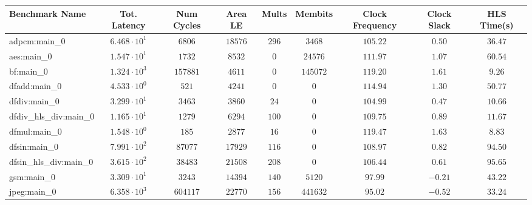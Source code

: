 \begin{tabular}{|l|c|c|c|c|c|c|c|c|}
\hline
Benchmark Name          & Tot. Latency           & Num Cycles  & Area LE    & Mults    & Membits    & Clock Frequency & Clock Slack & HLS Time(s) \\
\hline
adpcm:main\_0           & $ 6.468 \cdot 10^{1} $ & $ 6806    $ & $ 18576  $ & $ 296  $ & $ 3468   $ & $ 105.22      $ & $ 0.50    $ & $ 36.47   $ \\
aes:main\_0             & $ 1.547 \cdot 10^{1} $ & $ 1732    $ & $ 8532   $ & $ 0    $ & $ 24576  $ & $ 111.97      $ & $ 1.07    $ & $ 60.54   $ \\
bf:main\_0              & $ 1.324 \cdot 10^{3} $ & $ 157881  $ & $ 4611   $ & $ 0    $ & $ 145072 $ & $ 119.20      $ & $ 1.61    $ & $ 9.26    $ \\
dfadd:main\_0           & $ 4.533 \cdot 10^{0} $ & $ 521     $ & $ 4241   $ & $ 0    $ & $ 0      $ & $ 114.94      $ & $ 1.30    $ & $ 50.77   $ \\
dfdiv:main\_0           & $ 3.299 \cdot 10^{1} $ & $ 3463    $ & $ 3860   $ & $ 24   $ & $ 0      $ & $ 104.99      $ & $ 0.47    $ & $ 10.66   $ \\
dfdiv\_hls\_div:main\_0 & $ 1.165 \cdot 10^{1} $ & $ 1279    $ & $ 6294   $ & $ 100  $ & $ 0      $ & $ 109.75      $ & $ 0.89    $ & $ 11.67   $ \\
dfmul:main\_0           & $ 1.548 \cdot 10^{0} $ & $ 185     $ & $ 2877   $ & $ 16   $ & $ 0      $ & $ 119.47      $ & $ 1.63    $ & $ 8.83    $ \\
dfsin:main\_0           & $ 7.991 \cdot 10^{2} $ & $ 87077   $ & $ 17929  $ & $ 116  $ & $ 0      $ & $ 108.97      $ & $ 0.82    $ & $ 94.50   $ \\
dfsin\_hls\_div:main\_0 & $ 3.615 \cdot 10^{2} $ & $ 38483   $ & $ 21508  $ & $ 208  $ & $ 0      $ & $ 106.44      $ & $ 0.61    $ & $ 95.65   $ \\
gsm:main\_0             & $ 3.309 \cdot 10^{1} $ & $ 3243    $ & $ 14394  $ & $ 140  $ & $ 5120   $ & $ 97.99       $ & $ -0.21   $ & $ 43.22   $ \\
jpeg:main\_0            & $ 6.358 \cdot 10^{3} $ & $ 604117  $ & $ 22770  $ & $ 156  $ & $ 441632 $ & $ 95.02       $ & $ -0.52   $ & $ 33.24   $ \\

\end{tabular}
